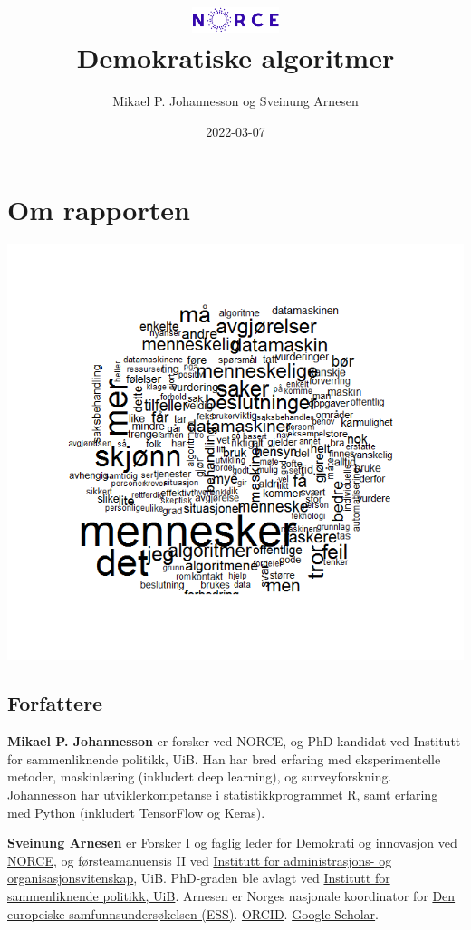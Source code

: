 \documentclass[
]{book}
\title{\includegraphics[width=1in,height=\textheight]{norce_logo.png}\\
Demokratiske algoritmer}
\author{Mikael P. Johannesson og Sveinung Arnesen}
\date{2022-03-07}
\begin{document}
\maketitle

{
\setcounter{tocdepth}{1}
\tableofcontents
}
\hypertarget{om}{%
\chapter{Om rapporten}\label{om}}

\includegraphics{figs/png/nav_ordsky.png}

\hypertarget{forfattere}{%
\section{Forfattere}\label{forfattere}}

\textbf{Mikael P. Johannesson} er forsker ved NORCE, og PhD-kandidat ved Institutt for sammenliknende politikk, UiB.
Han har bred erfaring med eksperimentelle metoder, maskinlæring (inkludert deep learning), og surveyforskning.
Johannesson har utviklerkompetanse i statistikkprogrammet R, samt erfaring med Python (inkludert TensorFlow og Keras).

\textbf{Sveinung Arnesen} er Forsker I og faglig leder for Demokrati og innovasjon ved \href{https://www.norceresearch.no/personer/sveinung-arnesen}{NORCE}, og førsteamanuensis II ved \href{https://www.uib.no/personer/Sveinung.Arnesen}{Institutt for administrasjons- og organisasjonsvitenskap}, UiB.
PhD-graden ble avlagt ved \href{https://www.uib.no/sampol}{Institutt for sammenliknende politikk, UiB}.
Arnesen er Norges nasjonale koordinator for \href{europeansocialsurvey.org}{Den europeiske samfunnsundersøkelsen (ESS)}. \href{https://orcid.org/0000-0002-2825-0664}{ORCID}. \href{https://scholar.google.com/citations?user=xz8JwjAAAAAJ\&hl=no\&oi=ao}{Google Scholar}.
\end{document}
